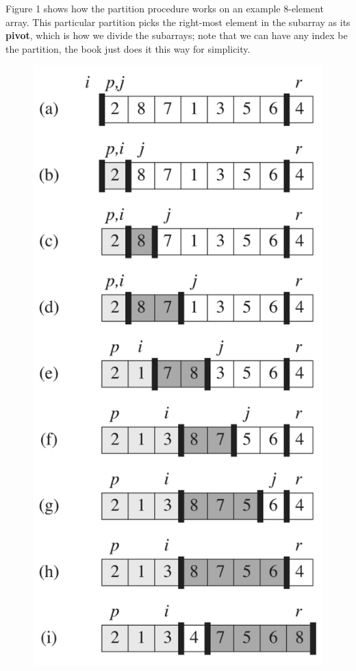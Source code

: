 \documentclass{article}
\begin{document}
Figure 1 shows how the partition procedure works on an example 8-element array. This particular partition picks the right-most element in the subarray as its \textbf{pivot}, which is how we divide the subarrays; note that we can have any index be the partition, the book just does it this way for simplicity.

\begin{figure}[!ht]
\includegraphics[scale=0.45]{quicksort_example}

\end{figure}
\end{document}
